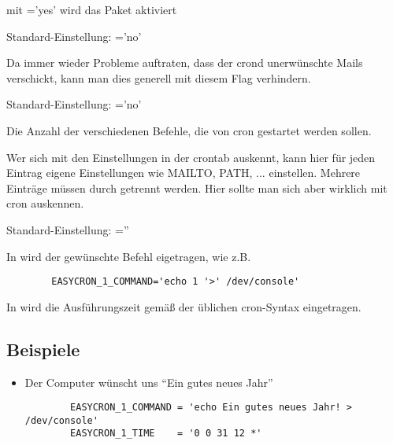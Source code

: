 \begin{description}
 mit ='yes' wird das Paket aktiviert

         Standard-Einstellung: ='no'


         Da immer wieder Probleme auftraten, dass der crond
         unerwünschte Mails verschickt, kann man dies generell mit
         diesem Flag verhindern. 

         Standard-Einstellung: ='no'


         Die Anzahl der verschiedenen Befehle, die von cron gestartet
         werden sollen.


         Wer sich mit den Einstellungen in der crontab auskennt, kann
         hier für jeden Eintrag eigene Einstellungen wie MAILTO, PATH,
         ... einstellen. Mehrere Einträge müssen durch 
	 \var{$\backslash\backslash$} getrennt werden. Hier sollte man sich
	 aber wirklich mit cron auskennen.

         Standard-Einstellung: =''


         In  wird der gewünschte Befehl
         eigetragen, wie z.B.
\begin{example}
\begin{verbatim}
        EASYCRON_1_COMMAND='echo 1 '>' /dev/console'
\end{verbatim}
\end{example}

         In  wird die Ausführungszeit gemäß der üblichen cron-Syntax eingetragen.




\subsection{Beispiele}

\begin{itemize}
\item Der Computer wünscht uns ``Ein gutes neues Jahr''
\begin{example}
\begin{verbatim}
        EASYCRON_1_COMMAND = 'echo Ein gutes neues Jahr! > /dev/console'
        EASYCRON_1_TIME    = '0 0 31 12 *'
\end{verbatim}
\end{example}




\end{itemize}
\end{description}
